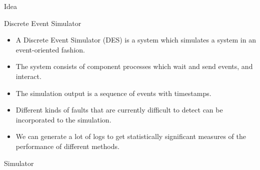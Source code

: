 \documentclass[final,xcolor={usenames,x11names}]{beamer}
\newlength{\onecolwid}
\begin{document}
\begin{frame}[t]
\begin{columns}[t]
\begin{column}{\onecolwid}
\begin{block}{Idea}
\end{block}

\vspace{3cm}

\begin{alertblock}{Discrete Event Simulator}

\begin{itemize}
 \item A Discrete Event Simulator (DES) is a system which simulates a system in an event-oriented fashion.
 \item The system consists of component processes which wait and send events, and interact.
 \item The simulation output is a sequence of events with timestamps.
 \item Different kinds of faults that are currently difficult to detect can be incorporated to the simulation.
 \item We can generate a lot of logs to get statistically significant measures of the performance of different methods.
\end{itemize}

\end{alertblock}

\vspace{3cm}

\begin{block}{Simulator}


\end{block}
\end{column}
\end{columns}
\end{frame}
\end{document}
